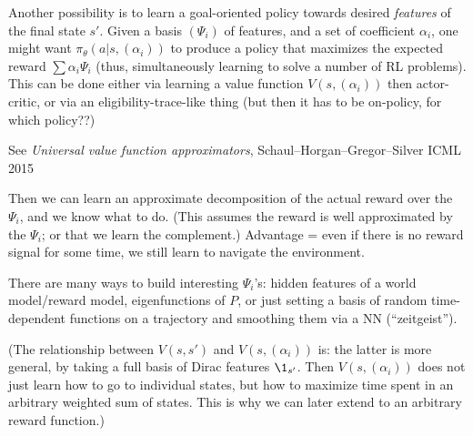 \documentclass[11pt,a4paper]{article}
\begin{document}
Another possibility is to learn a goal-oriented policy towards desired
\emph{features} of the final state $s'$. Given a basis $(\Psi_i)$ of
features, and a set of coefficient $\alpha_i$, one might want
$\pi_\theta(a|s,(\alpha_i))$ to produce a policy that maximizes the
expected reward $\sum \alpha_i \Psi_i$ (thus, simultaneously learning to
solve a number of RL problems). 
This can be done either via learning a value function $V(s,(\alpha_i))$
then actor-critic, or via an eligibility-trace-like thing (but then it
has to be on-policy, for which policy??)

See \emph{Universal value function approximators},
Schaul--Horgan--Gregor--Silver ICML 2015

Then we can learn an approximate decomposition of the actual reward over
the $\Psi_i$, and we know what to do. (This assumes the reward is well
approximated by the $\Psi_i$; or that we learn the complement.) Advantage
= even if there is no reward signal for some time, we still learn to
navigate the environment.

There are many ways to build interesting
$\Psi_i$'s: hidden features of a world model/reward model, eigenfunctions
of $P$, or just setting a basis of random time-dependent functions on a
trajectory and smoothing them via a NN (``zeitgeist'').

(The relationship between $V(s,s')$ and $V(s,(\alpha_i))$ is: the latter
is more general, by taking a full basis of Dirac features $\1_{s'}$. Then
$V(s,(\alpha_i))$ does not just learn how to go to individual states, but
how to maximize time spent in an arbitrary weighted sum of states. This
is why we can later extend to an arbitrary reward function.)
\end{document}
